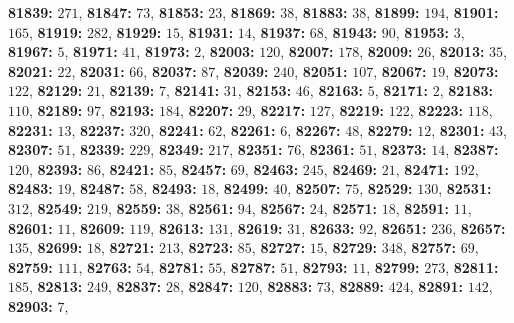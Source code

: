 \textsf{\bfseries 81839:} $271$, \textsf{\bfseries 81847:} $73$, \textsf{\bfseries 81853:} $23$, \textsf{\bfseries 81869:} $38$, \textsf{\bfseries 81883:} $38$, \textsf{\bfseries 81899:} $194$, \textsf{\bfseries 81901:} $165$, \textsf{\bfseries 81919:} $282$, \textsf{\bfseries 81929:} $15$, \textsf{\bfseries 81931:} $14$, \textsf{\bfseries 81937:} $68$, \textsf{\bfseries 81943:} $90$, \textsf{\bfseries 81953:} $3$, \textsf{\bfseries 81967:} $5$, \textsf{\bfseries 81971:} $41$, \textsf{\bfseries 81973:} $2$, \textsf{\bfseries 82003:} $120$, \textsf{\bfseries 82007:} $178$, \textsf{\bfseries 82009:} $26$, \textsf{\bfseries 82013:} $35$, \textsf{\bfseries 82021:} $22$, \textsf{\bfseries 82031:} $66$, \textsf{\bfseries 82037:} $87$, \textsf{\bfseries 82039:} $240$, \textsf{\bfseries 82051:} $107$, \textsf{\bfseries 82067:} $19$, \textsf{\bfseries 82073:} $122$, \textsf{\bfseries 82129:} $21$, \textsf{\bfseries 82139:} $7$, \textsf{\bfseries 82141:} $31$, \textsf{\bfseries 82153:} $46$, \textsf{\bfseries 82163:} $5$, \textsf{\bfseries 82171:} $2$, \textsf{\bfseries 82183:} $110$, \textsf{\bfseries 82189:} $97$, \textsf{\bfseries 82193:} $184$, \textsf{\bfseries 82207:} $29$, \textsf{\bfseries 82217:} $127$, \textsf{\bfseries 82219:} $122$, \textsf{\bfseries 82223:} $118$, \textsf{\bfseries 82231:} $13$, \textsf{\bfseries 82237:} $320$, \textsf{\bfseries 82241:} $62$, \textsf{\bfseries 82261:} $6$, \textsf{\bfseries 82267:} $48$, \textsf{\bfseries 82279:} $12$, \textsf{\bfseries 82301:} $43$, \textsf{\bfseries 82307:} $51$, \textsf{\bfseries 82339:} $229$, \textsf{\bfseries 82349:} $217$, \textsf{\bfseries 82351:} $76$, \textsf{\bfseries 82361:} $51$, \textsf{\bfseries 82373:} $14$, \textsf{\bfseries 82387:} $120$, \textsf{\bfseries 82393:} $86$, \textsf{\bfseries 82421:} $85$, \textsf{\bfseries 82457:} $69$, \textsf{\bfseries 82463:} $245$, \textsf{\bfseries 82469:} $21$, \textsf{\bfseries 82471:} $192$, \textsf{\bfseries 82483:} $19$, \textsf{\bfseries 82487:} $58$, \textsf{\bfseries 82493:} $18$, \textsf{\bfseries 82499:} $40$, \textsf{\bfseries 82507:} $75$, \textsf{\bfseries 82529:} $130$, \textsf{\bfseries 82531:} $312$, \textsf{\bfseries 82549:} $219$, \textsf{\bfseries 82559:} $38$, \textsf{\bfseries 82561:} $94$, \textsf{\bfseries 82567:} $24$, \textsf{\bfseries 82571:} $18$, \textsf{\bfseries 82591:} $11$, \textsf{\bfseries 82601:} $11$, \textsf{\bfseries 82609:} $119$, \textsf{\bfseries 82613:} $131$, \textsf{\bfseries 82619:} $31$, \textsf{\bfseries 82633:} $92$, \textsf{\bfseries 82651:} $236$, \textsf{\bfseries 82657:} $135$, \textsf{\bfseries 82699:} $18$, \textsf{\bfseries 82721:} $213$, \textsf{\bfseries 82723:} $85$, \textsf{\bfseries 82727:} $15$, \textsf{\bfseries 82729:} $348$, \textsf{\bfseries 82757:} $69$, \textsf{\bfseries 82759:} $111$, \textsf{\bfseries 82763:} $54$, \textsf{\bfseries 82781:} $55$, \textsf{\bfseries 82787:} $51$, \textsf{\bfseries 82793:} $11$, \textsf{\bfseries 82799:} $273$, \textsf{\bfseries 82811:} $185$, \textsf{\bfseries 82813:} $249$, \textsf{\bfseries 82837:} $28$, \textsf{\bfseries 82847:} $120$, \textsf{\bfseries 82883:} $73$, \textsf{\bfseries 82889:} $424$, \textsf{\bfseries 82891:} $142$, \textsf{\bfseries 82903:} $7$, 
